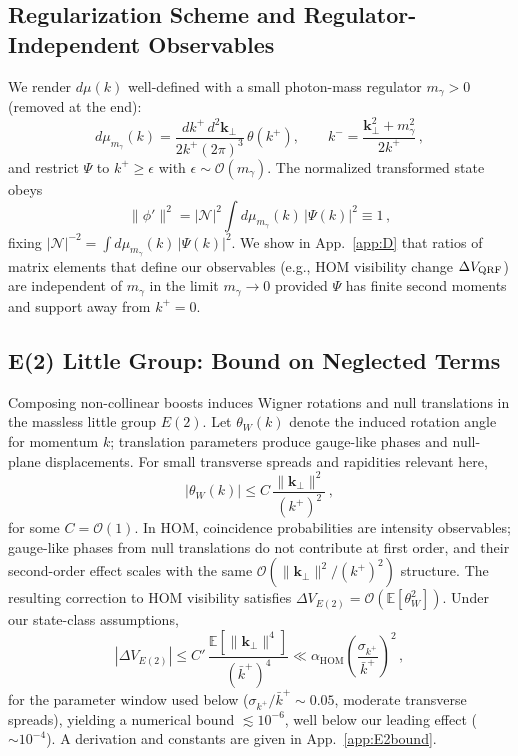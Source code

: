 \documentclass[aps,11pt]{article}
\newcommand{\E}{\mathbb{E}}
\newcommand{\kplus}{k^{+}}
\newcommand{\kperp}{\mathbf{k}_{\perp}}
\newcommand{\kbar}{\bar{k}^{+}}
\newcommand{\alphahom}{\alpha_{\text{HOM}}}
\begin{document}
\subsection{Regularization Scheme and Regulator-Independent Observables}\label{sec:reg}
We render \(d\mu(k)\) well-defined with a small photon-mass regulator \(m_\gamma>0\) (removed at the end):
\begin{equation}
d\mu_{m_\gamma}(k)=\frac{d\kplus\, d^2\kperp}{2\kplus(2\pi)^3}\,\theta(\kplus),\qquad
k^-=\frac{\kperp^2+m_\gamma^2}{2\kplus}\,,
\end{equation}
and restrict \(\Psi\) to \(\kplus\ge\epsilon\) with \(\epsilon\sim \mathcal{O}(m_\gamma)\). The normalized transformed state obeys
\begin{equation}
\|\phi'\|^2 = |\mathcal N|^2 \int d\mu_{m_\gamma}(k)\,|\Psi(k)|^2 \equiv 1\,,
\end{equation}
fixing \(|\mathcal N|^{-2}= \int d\mu_{m_\gamma}(k)\,|\Psi(k)|^2\). We show in App.~\ref{app:D} that ratios of matrix elements that define our observables (e.g., HOM visibility change \(\Delta V_{\rm QRF}\)) are independent of \(m_\gamma\) in the limit \(m_\gamma\to0\) provided \(\Psi\) has finite second moments and support away from \(\kplus=0\).

\subsection{E(2) Little Group: Bound on Neglected Terms}\label{sec:E2}
Composing non-collinear boosts induces Wigner rotations and null translations in the massless little group \(E(2)\). Let \(\theta_W(k)\) denote the induced rotation angle for momentum \(k\); translation parameters produce gauge-like phases and null-plane displacements. For small transverse spreads and rapidities relevant here,
\begin{equation}
|\theta_W(k)| \le C\, \frac{\|\kperp\|^{2}}{(\kplus)^{2}}\,,
\end{equation}
for some \(C=\mathcal O(1)\). In HOM, coincidence probabilities are intensity observables; gauge-like phases from null translations do not contribute at first order, and their second-order effect scales with the same \(\mathcal O(\|\kperp\|^{2}/(\kplus)^{2})\) structure. The resulting correction to HOM visibility satisfies \(\Delta V_{E(2)}=\mathcal O(\E[\theta_W^2])\). Under our state-class assumptions,
\begin{equation}\label{eq:E2bound}
|\Delta V_{E(2)}| \le C'\, \frac{\E[\|\kperp\|^{4}]}{(\kbar)^{4}} \ll \alphahom\left(\frac{\sigma_{\kplus}}{\kbar}\right)^{2}\,,
\end{equation}
for the parameter window used below (\(\sigma_{\kplus}/\kbar\sim 0.05\), moderate transverse spreads), yielding a numerical bound \(\lesssim 10^{-6}\), well below our leading effect (\(\sim 10^{-4}\)). A derivation and constants are given in App.~\ref{app:E2bound}.
\end{document}
